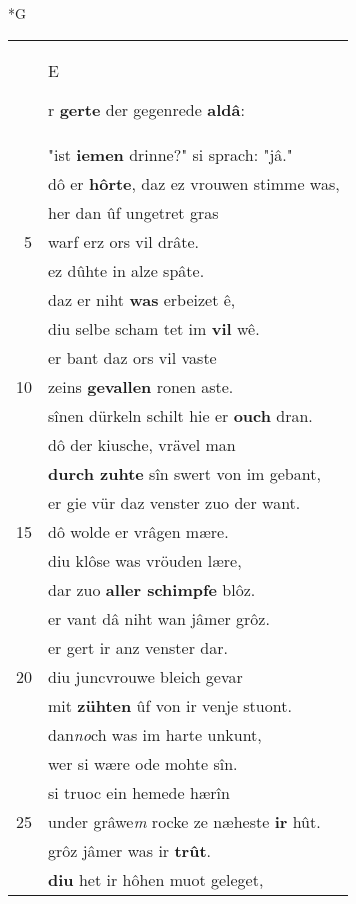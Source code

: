 \documentclass[8pt,a4paper,notitlepage]{article}
\begin{document}
\newpage
\begin{table}[ht]
\begin{minipage}[t]{0.5\linewidth}
\small
\begin{center}*G
\end{center}
\begin{tabular}{rl}
 & \begin{large}E\end{large}r \textbf{gerte} der gegenrede \textbf{aldâ}:\\ 
 & "ist \textbf{iemen} drinne?" si sprach: "jâ."\\ 
 & dô er \textbf{hôrte}, daz ez vrouwen stimme was,\\ 
 & her dan ûf ungetret gras\\ 
5 & warf erz ors vil drâte.\\ 
 & ez dûhte in alze spâte.\\ 
 & daz er niht \textbf{was} erbeizet ê,\\ 
 & diu selbe scham tet im \textbf{vil} wê.\\ 
 & er bant daz ors vil vaste\\ 
10 & zeins \textbf{gevallen} ronen aste.\\ 
 & sînen dürkeln schilt hie er \textbf{ouch} dran.\\ 
 & dô der kiusche, vrävel man\\ 
 & \textbf{durch zuhte} sîn swert von im gebant,\\ 
 & er gie vür daz venster zuo der want.\\ 
15 & dô wolde er vrâgen mære.\\ 
 & diu klôse was vröuden lære,\\ 
 & dar zuo \textbf{aller schimpfe} blôz.\\ 
 & er vant dâ niht wan jâmer grôz.\\ 
 & er gert ir anz venster dar.\\ 
20 & diu juncvrouwe bleich gevar\\ 
 & mit \textbf{zühten} ûf von ir venje stuont.\\ 
 & dan\textit{no}ch was im harte unkunt,\\ 
 & wer si wære ode mohte sîn.\\ 
 & si truoc ein hemede hærîn\\ 
25 & under grâwe\textit{m} rocke ze næheste \textbf{ir} hût.\\ 
 & grôz jâmer was ir \textbf{trût}.\\ 
 & \textbf{diu} het ir hôhen muot geleget,\\ 

\end{tabular}
\end{minipage}
\end{table}
\end{document}
